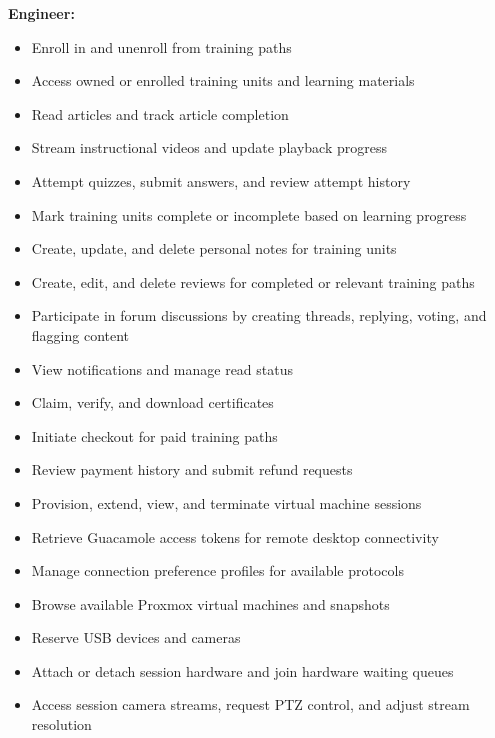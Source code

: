 \textbf{Engineer:}
\begin{itemize}[label=-]
    \item Enroll in and unenroll from training paths
    \item Access owned or enrolled training units and learning materials
    \item Read articles and track article completion
    \item Stream instructional videos and update playback progress
    \item Attempt quizzes, submit answers, and review attempt history
    \item Mark training units complete or incomplete based on learning progress
    \item Create, update, and delete personal notes for training units
    \item Create, edit, and delete reviews for completed or relevant training paths
    \item Participate in forum discussions by creating threads, replying, voting, and
          flagging content
    \item View notifications and manage read status
    \item Claim, verify, and download certificates
    \item Initiate checkout for paid training paths
    \item Review payment history and submit refund requests
    \item Provision, extend, view, and terminate virtual machine sessions
    \item Retrieve Guacamole access tokens for remote desktop connectivity
    \item Manage connection preference profiles for available protocols
    \item Browse available Proxmox virtual machines and snapshots
    \item Reserve USB devices and cameras
    \item Attach or detach session hardware and join hardware waiting queues
    \item Access session camera streams, request PTZ control, and adjust stream
          resolution
\end{itemize}

